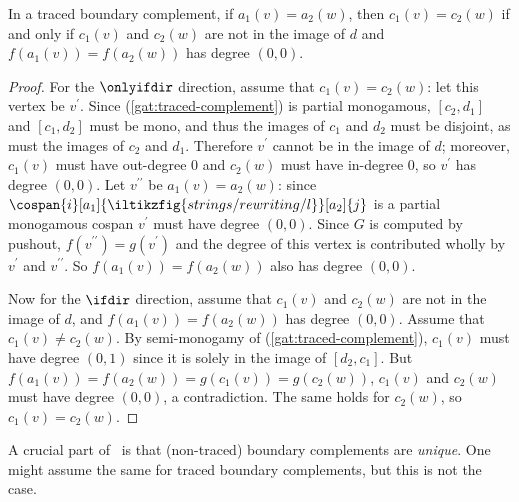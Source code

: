 \begin{lemma}
    In a traced boundary complement, if \(a_1(v) = a_2(w)\), then \(c_1(v) = c_2(w)\) if and only if \(c_1(v)\) and \(c_2(w)\) are not in the image of \(d\) and \(f(a_1(v)) = f(a_2(w))\) has degree \((0,0)\).
\end{lemma}
\begin{proof}
    For the \(\onlyifdir\) direction, assume that \(c_1(v) = c_2(w)\): let this vertex be \(v^\prime\).
    Since (\ref{gat:traced-complement}) is partial monogamous, \([c_2,d_1]\) and \([c_1,d_2]\) must be mono, and thus the images of \(c_1\) and \(d_2\) must be disjoint, as must the images of \(c_2\) and \(d_1\).
    Therefore \(v^\prime\) cannot be in the image of \(d\); moreover, \(c_1(v)\) must have out-degree \(0\) and \(c_2(w)\) must have in-degree \(0\), so \(v^\prime\) has degree \((0,0)\).
    Let \(v^{\prime\prime}\) be \(a_1(v) = a_2(w)\): since \(\cospan{i}[a_1]{\iltikzfig{strings/rewriting/l}}[a_2]{j}\) is a partial monogamous cospan \(v^\prime\) must have degree \((0,0)\).
    Since \(G\) is computed by pushout, \(f(v^{\prime\prime}) = g(v^{\prime})\) and the degree of this vertex is contributed wholly by \(v^\prime\) and \(v^{\prime\prime}\).
    So \(f(a_1(v)) = f(a_2(w))\) also has degree \((0,0)\).


    Now for the \(\ifdir\) direction, assume that \(c_1(v)\) and \(c_2(w)\) are not in the image of \(d\), and \(f(a_1(v)) = f(a_2(w))\) has degree \((0,0)\).
    Assume that \(c_1(v) \neq c_2(w)\).
    By semi-monogamy of (\ref{gat:traced-complement}), \(c_1(v)\) must have degree \((0,1)\) since it is solely in the image of \([d_2, c_1]\).
    But \(f(a_1(v)) = f(a_2(w)) = g(c_1(v)) = g(c_2(w))\), \(c_1(v)\) and \(c_2(w)\) must have degree \((0,0)\), a contradiction.
    The same holds for \(c_2(w)\), so \(c_1(v) = c_2(w)\).
\end{proof}

\noindent
A crucial part of~\cite{bonchi2021string} is that (non-traced) boundary complements are \emph{unique}.
One might assume the same for traced boundary complements, but this is not the case.

